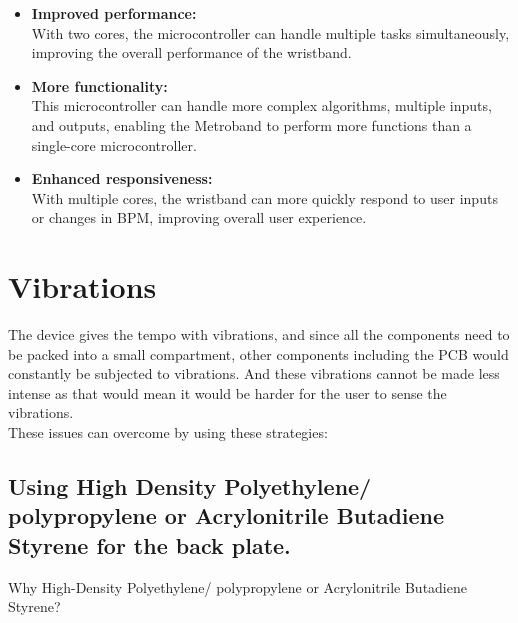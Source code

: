 \documentclass{article}
\begin{document}
        \begin{itemize}
            \item \textbf{Improved performance:}\\ 
            With two cores, the microcontroller can handle multiple tasks simultaneously, improving the overall performance of the wristband.
            
            \item \textbf{More functionality:} \\
            This microcontroller can handle more complex algorithms, multiple inputs, and outputs, enabling the Metroband to perform more functions than a single-core microcontroller.

            \item \textbf{Enhanced responsiveness:} \\
            With multiple cores, the wristband can more quickly respond to user inputs or changes in BPM, improving overall user experience.
        \end{itemize}


        \section{Vibrations}
        The device gives the tempo with vibrations, and since all the components need to be packed into a small compartment, other components including the PCB would constantly be subjected to vibrations. And these vibrations cannot be made less intense as that would mean it would be harder for the user to sense the vibrations.\\
        
        These issues can overcome by using these strategies:
        
        \subsection{Using High Density Polyethylene/ polypropylene or Acrylonitrile Butadiene Styrene for the back plate.}
        
        Why High-Density Polyethylene/ polypropylene or Acrylonitrile Butadiene Styrene?
\end{document}
